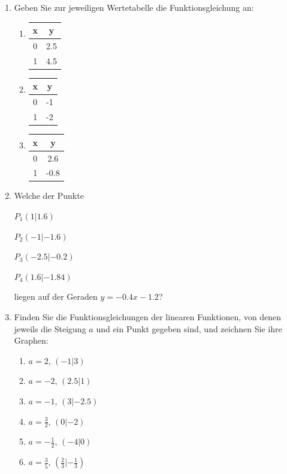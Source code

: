 \documentclass[%
11pt,%
twoside,%
titlepage,%
german,%
headsepline%
]{scrartcl}
\begin{document}
{{{\begin{enumerate}
\item Geben Sie zur jeweiligen Wertetabelle die Funktionsgleichung an:
  \begin{enumerate}
  \item 
    \begin{tabular}{|c|c|} 
      \hline 
      x & y \\ \hline\hline
      0 & 2.5 \\ \hline
      1 & 4.5 \\ \hline
    \end{tabular}
  \item 
    \begin{tabular}{|c|c|} 
      \hline 
      x & y \\ \hline\hline
      0 & -1 \\ \hline
      1 & -2 \\ \hline
    \end{tabular}
  \item 
    \begin{tabular}{|c|c|} 
      \hline 
      x & y \\ \hline\hline
      0 & 2.6 \\ \hline
      1 & -0.8 \\ \hline
    \end{tabular}
  \end{enumerate}

\item Welche der Punkte 

$P_1(1|1.6)$

$P_2(-1|-1.6)$

$P_3(-2.5|-0.2)$

$P_4(1.6|-1.84)$

\noindent
liegen auf der Geraden $y=-0.4x-1.2$?

\item Finden Sie die Funktionsgleichungen der linearen Funktionen, von denen jeweils die Steigung $a$ und ein Punkt gegeben sind, und zeichnen Sie ihre Graphen:
  \begin{enumerate}
  \item $a=2$, $(-1|3)$
  \item $a=-2$, $(2.5|1)$
  \item $a=-1$, $(3|-2.5)$
  \item $a=\frac{3}{2}$, $(0|-2)$
  \item $a=-\frac{1}{2}$, $(-4|0)$
  \item $a=\frac{3}{5}$, $(\frac{2}{3}|-\frac{1}{3})$
  \end{enumerate}


\end{enumerate}}}}
\end{document}
